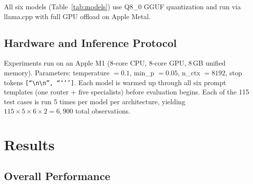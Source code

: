 \documentclass[11pt,twocolumn]{article}
\begin{document}
All six models (Table~\ref{tab:models}) use Q8\_0 GGUF quantization
and run via llama.cpp \citep{llamacpp2023} with full GPU offload on
Apple Metal.

\subsection{Hardware and Inference Protocol}

Experiments run on an Apple M1 (8-core CPU, 8-core GPU, 8\,GB unified
memory).
Parameters: temperature $= 0.1$, min\_p $= 0.05$, n\_ctx $= 8192$,
stop tokens \texttt{[``\textbackslash n\textbackslash n'', ```'']}.
Each model is warmed up through all six prompt templates (one router +
five specialists) before evaluation begins.
Each of the 115 test cases is run 5 times per model per architecture,
yielding $115\!\times\!5\!\times\!6\!\times\!2 = 6{,}900$ total
observations.

\section{Results}

\subsection{Overall Performance}
\end{document}
